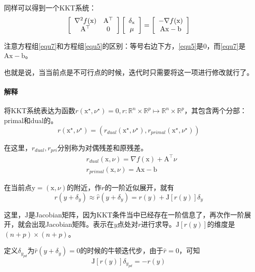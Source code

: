 \documentclass[a4paper]{D:/MyRepo/Script/latex/PaperReadingLog}
\begin{document}
同样可以得到一个KKT系统：
\begin{equation}
    \label{equ7}
    \left[
\begin{array}[]{cc}
    \nabla^2 f(\mathrm{x}) & \mathrm{A}^\top \\
    \mathrm{A}^\top & 0
\end{array}
\right]
\left[
\begin{array}[]{c}
    \delta_\mathrm{x}\\
    \mu
\end{array}
\right]
=
\left[
\begin{array}[]{c}
    -\nabla f(\mathrm{x})\\
    \mathrm{A}\mathrm{x}-\mathrm{b}
\end{array}
\right]
\end{equation}

注意方程组\ref{equ7}和方程组\ref{equ5}的区别：等号右边下方，\ref{equ5}是0，而\ref{equ7}是$\mathrm{A}\mathrm{x}-\mathrm{b}$。

也就是说，当当前点是不可行点的时候，迭代时只需要将这一项进行修改就行了。

\paragraph{解释}
将KKT系统表达为函数$r(\mathrm{x}^\star,\nu^\star)=0,r:\mathbb{R}^n\times\mathbb{R}^p\mapsto\mathbb{R}^n\times\mathbb{R}^p$，其包含两个分部：primal和dual的。
$$
r(\mathrm{x}^\star,\nu^\star)=(r_{dual}(\mathrm{x}^\star,\nu^\star),r_{primal}(\mathrm{x}^\star,\nu^\star))
$$

在这里，$r_{dual},r_{pri}$分别称为对偶残差和原残差。
$$
\begin{aligned}
    &r_{dual}(\mathrm{x},\nu)=\nabla f(\mathrm{x})+\mathrm{A}^\top \nu\\
    &r_{primal}(\mathrm{x},\nu)=\mathrm{A}\mathrm{x}-\mathrm{b}
\end{aligned}
$$

在当前点$\mathrm{y}=(\mathrm{x},\nu)$的附近，作$r$的一阶近似展开，就有
$$
r(y+\delta_y)\approx \hat{r}(y+\delta_y)=r(y)+\mathrm{J}[r(y)]\delta_y
$$

这里，$\mathrm{J}$是Jacobian矩阵，因为KKT条件当中已经存在一阶信息了，再次作一阶展开，就会出现Jacobian矩阵。表示在$y$点处对$r$进行求导。$\mathrm{J}[r(y)]$的维度是$(n+p)\times (n+p)$。

定义$\delta_{y_{pd}}$为$\hat{r}(y+\delta_y)=0$的时候的牛顿迭代步，由于$\hat{r}=0$，可知
$$
\mathrm{J}[r(y)]\delta_{y_{pd}}=-r(y)
$$
\end{document}
